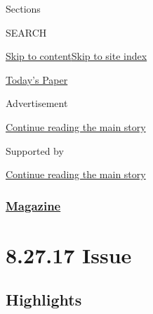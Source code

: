 Sections

SEARCH

\protect\hyperlink{site-content}{Skip to
content}\protect\hyperlink{site-index}{Skip to site index}

\href{https://myaccount.nytimes3xbfgragh.onion/auth/login?response_type=cookie\&client_id=vi}{}

\href{https://www.nytimes3xbfgragh.onion/section/todayspaper}{Today's
Paper}

Advertisement

\protect\hyperlink{after-top}{Continue reading the main story}

Supported by

\protect\hyperlink{after-sponsor}{Continue reading the main story}

\hypertarget{magazine}{%
\subsubsection{\texorpdfstring{\href{/section/magazine}{Magazine}}{Magazine}}\label{magazine}}

\hypertarget{82717-issue}{%
\section{8.27.17 Issue}\label{82717-issue}}

\hypertarget{highlights}{%
\subsection{Highlights}\label{highlights}}

